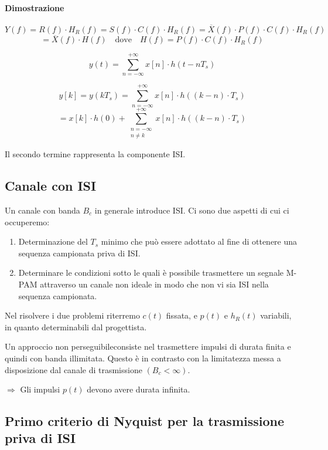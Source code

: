 \paragraph*{Dimostrazione}
\[ Y(f) = R(f) \cdot H_R(f) = S(f) \cdot C(f) \cdot H_R(f) = \overline{X}(f) \cdot P(f) \cdot C(f) \cdot H_R(f) \]
\[ = \overline{X}(f) \cdot H(f) \quad  \text{dove} \quad H(f) = P(f) \cdot C(f) \cdot H_R(f) \]

\[ y(t) = \sum_{n=-\infty}^{+\infty} x[n] \cdot h(t - nT_s) \]

\[ y[k] = y(kT_s) = \sum_{n=-\infty}^{+\infty} x[n] \cdot h((k - n) \cdot T_s)  \]
\[ = x[k] \cdot h(0) + \sum_{\substack{n=-\infty \\ n \neq k}}^{+\infty} x[n]\cdot h((k - n) \cdot T_s) \]

Il secondo termine rappresenta la componente ISI.




\subsection*{Canale con ISI}

Un canale con banda \( B_c \) in generale introduce ISI. Ci sono due aspetti di cui ci occuperemo:

\begin{enumerate}
    \item Determinazione del \( T_s \) minimo che può essere adottato al fine di ottenere una sequenza campionata priva di ISI.
    \item Determinare le condizioni sotto le quali è possibile trasmettere un segnale M-PAM attraverso un canale non ideale in modo che non vi sia ISI nella sequenza campionata.
\end{enumerate}

Nel risolvere i due problemi riterremo \( c(t) \) fissata, e \( p(t) \) e \( h_R(t) \) variabili, in quanto determinabili dal progettista.

Un approccio non perseguibileconsiste nel trasmettere impulsi di durata finita e quindi con banda illimitata. Questo è in contrasto con la limitatezza messa a disposizione dal canale di trasmissione \( (B_c < \infty) \).

\(\Rightarrow\) Gli impulsi \( p(t) \) devono avere durata infinita.

\subsection*{Primo criterio di Nyquist per la trasmissione priva di ISI}

